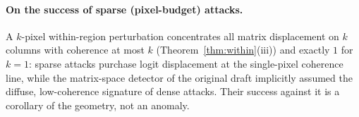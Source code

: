 \paragraph{On the success of sparse (pixel-budget) attacks.}
A $k$-pixel
within-region perturbation concentrates all matrix displacement on $k$
columns with coherence at most $k$ (Theorem~\ref{thm:within}(iii)) and
exactly $1$ for $k{=}1$: sparse attacks purchase logit displacement at the
single-pixel coherence line, while the matrix-space detector of the
original draft implicitly assumed the diffuse, low-coherence signature of
dense attacks. Their success against it is a corollary of the geometry,
not an anomaly.
